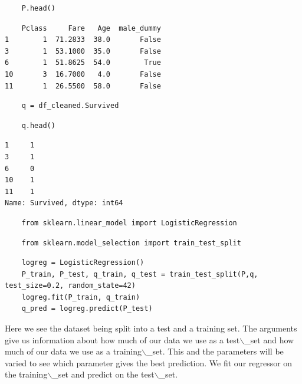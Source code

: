 \documentclass[11pt]{article}
\begin{document}
\begin{verbatim}
    P.head()
\end{verbatim}

\begin{verbatim}
    Pclass     Fare   Age  male_dummy
1        1  71.2833  38.0       False
3        1  53.1000  35.0       False
6        1  51.8625  54.0        True
10       3  16.7000   4.0       False
11       1  26.5500  58.0       False
\end{verbatim}

\begin{verbatim}
    q = df_cleaned.Survived
\end{verbatim}

\begin{verbatim}
    q.head()
\end{verbatim}

\begin{verbatim}
1     1
3     1
6     0
10    1
11    1
Name: Survived, dtype: int64
\end{verbatim}

\begin{verbatim}
    from sklearn.linear_model import LogisticRegression
\end{verbatim}

\begin{verbatim}
    from sklearn.model_selection import train_test_split
\end{verbatim}

\begin{verbatim}
    logreg = LogisticRegression()
    P_train, P_test, q_train, q_test = train_test_split(P,q, test_size=0.2, random_state=42)
    logreg.fit(P_train, q_train)
    q_pred = logreg.predict(P_test)
\end{verbatim}

Here we see the dataset being split into a test and a training set. The
arguments give us information about how much of our data we use as a
test$\backslash$\_set and how much of our data we use as a training$\backslash$\_set. This and
the parameters will be varied to see which parameter gives the best
prediction. We fit our regressor on the training$\backslash$\_set and predict on the
test$\backslash$\_set.
\end{document}
